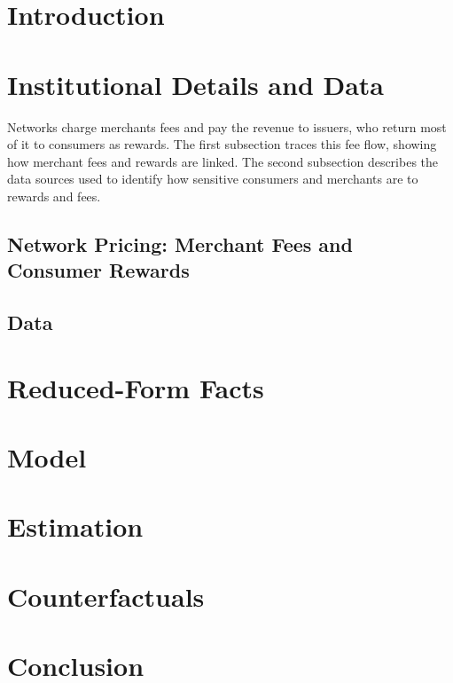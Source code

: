 \documentclass[12pt]{article}
\begin{document}
\begin{refsection}
\section{Introduction}



\section{Institutional Details and Data}
\label{sec:institutional-data}

Networks charge merchants fees and pay the revenue to issuers, who return most of it to consumers as rewards.
The first subsection traces this fee flow, showing how merchant fees and rewards are linked.
The second subsection describes the data sources used to identify how sensitive consumers and merchants are to rewards and fees.

\subsection{Network Pricing: Merchant Fees and Consumer Rewards}



\subsection{Data}



\section{Reduced-Form Facts}
\label{sec:reduced-form}



\section{Model}
\label{sec:model}



\section{Estimation}
\label{sec:estimation}


\section{Counterfactuals}
\label{sec:counterfactuals}



\section{Conclusion}



\clearpage

\begin{singlespace}
    \printbibliography
\end{singlespace}
\end{refsection}
\end{document}
